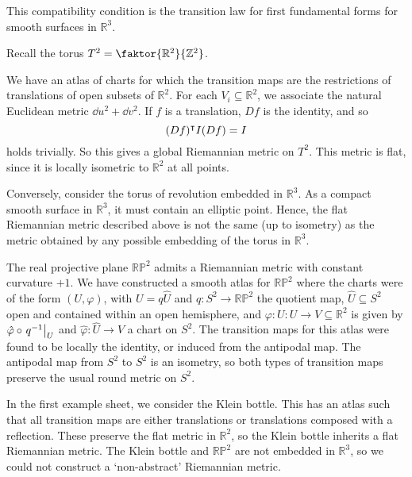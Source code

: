 This compatibility condition is the transition law for first fundamental forms for smooth surfaces in \( \mathbb R^3 \).
\begin{example}
	Recall the torus \( T^2 = \faktor{\mathbb R^2}{\mathbb Z^2} \).
	\begin{center}
	\end{center}
	We have an atlas of charts for which the transition maps are the restrictions of translations of open subsets of \( \mathbb R^2 \).
	For each \( V_i \subseteq \mathbb R^2 \), we associate the natural Euclidean metric \( \dd{u}^2 + \dd{v}^2 \).
	If \( f \) is a translation, \( Df \) is the identity, and so
	\[ (Df)^\intercal I (Df) = I \]
	holds trivially.
	So this gives a global Riemannian metric on \( T^2 \).
	This metric is flat, since it is locally isometric to \( \mathbb R^2 \) at all points.

	Conversely, consider the torus of revolution embedded in \( \mathbb R^3 \).
	As a compact smooth surface in \( \mathbb R^3 \), it must contain an elliptic point.
	Hence, the flat Riemannian metric described above is not the same (up to isometry) as the metric obtained by any possible embedding of the torus in \( \mathbb R^3 \).

	The real projective plane \( \mathbb R \mathbb P^2 \) admits a Riemannian metric with constant curvature \( +1 \).
	We have constructed a smooth atlas for \( \mathbb R \mathbb P^2 \) where the charts were of the form \( (U, \varphi) \), with \( U = q \hat U \) and \( q \colon S^2 \to \mathbb R \mathbb P^2 \) the quotient map, \( \hat U \subseteq S^2 \) open and contained within an open hemisphere, and \( \varphi \colon U \colon U \to V \subseteq \mathbb R^2 \) is given by \( \hat \varphi \circ \eval{q^{-1}}_U \) and \( \hat \varphi \colon \hat U \to V \) a chart on \( S^2 \).
	The transition maps for this atlas were found to be locally the identity, or induced from the antipodal map.
	The antipodal map from \( S^2 \) to \( S^2 \) is an isometry, so both types of transition maps preserve the usual round metric on \( S^2 \).

	In the first example sheet, we consider the Klein bottle.
	This has an atlas such that all transition maps are either translations or translations composed with a reflection.
	These preserve the flat metric in \( \mathbb R^2 \), so the Klein bottle inherits a flat Riemannian metric.
	The Klein bottle and \( \mathbb R \mathbb P^2 \) are not embedded in \( \mathbb R^3 \), so we could not construct a `non-abstract' Riemannian metric.
\end{example}
